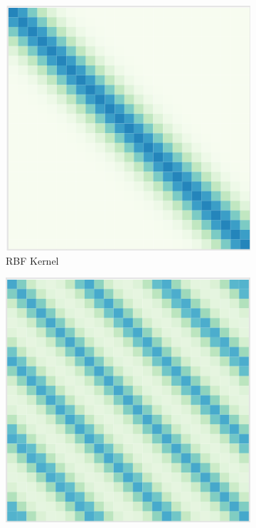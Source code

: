 \begin{figure}
     \centering
     \begin{subfigure}[b]{0.3\textwidth}
         \centering
         \includegraphics[width=\textwidth]{Figures/kernel_rbf.png}
         \caption{RBF Kernel}
         \label{fig:kernel_rbf}
     \end{subfigure}
     \hfill
     \begin{subfigure}[b]{0.3\textwidth}
         \centering
         \includegraphics[width=\textwidth]{Figures/kernel_periodic.png}

\end{subfigure}
\end{figure}
